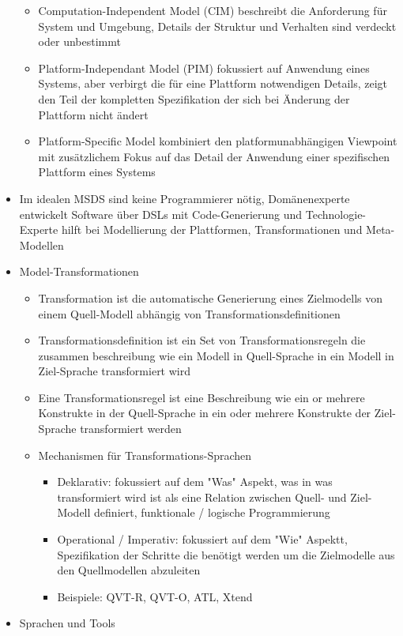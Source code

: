 \documentclass[paper=a4, fontsize=11pt]{scrartcl} %
\numberwithin{equation}{section} %
\numberwithin{figure}{section} %
\numberwithin{table}{section} %
\begin{document}
\begin{itemize}
\begin{itemize}
    \item Computation-Independent Model (CIM) beschreibt die Anforderung für System und Umgebung, Details der Struktur und Verhalten sind verdeckt oder unbestimmt
    \item Platform-Independant Model (PIM) fokussiert auf Anwendung eines Systems, aber verbirgt die für eine Plattform notwendigen Details, zeigt den Teil der kompletten Spezifikation der sich bei Änderung der Plattform nicht ändert
    \item Platform-Specific Model kombiniert den platformunabhängigen Viewpoint mit zusätzlichem Fokus auf das Detail der Anwendung einer spezifischen Plattform eines Systems
  \end{itemize}
  \item Im idealen MSDS sind keine Programmierer nötig, Domänenexperte entwickelt Software über DSLs mit Code-Generierung und Technologie-Experte hilft bei Modellierung der Plattformen, Transformationen und Meta-Modellen
  \item Model-Transformationen
  \begin{itemize}
    \item Transformation ist die automatische Generierung eines Zielmodells von einem Quell-Modell abhängig von Transformationsdefinitionen
    \item Transformationsdefinition ist ein Set von Transformationsregeln die zusammen beschreibung wie ein Modell in Quell-Sprache in ein Modell in Ziel-Sprache transformiert wird
    \item Eine Transformationsregel ist eine Beschreibung wie ein or mehrere Konstrukte in der Quell-Sprache in ein oder mehrere Konstrukte der Ziel-Sprache transformiert werden
    \item Mechanismen für Transformations-Sprachen
    \begin{itemize}
      \item Deklarativ: fokussiert auf dem "Was" Aspekt, was in was transformiert wird ist als eine Relation zwischen Quell- und Ziel-Modell definiert, funktionale / logische Programmierung
      \item Operational / Imperativ: fokussiert auf dem "Wie" Aspektt, Spezifikation der Schritte die benötigt werden um die Zielmodelle aus den Quellmodellen abzuleiten
      \item Beispiele: QVT-R, QVT-O, ATL, Xtend
    \end{itemize}
  \end{itemize}
  \item Sprachen und Tools

\end{itemize}
\end{document}
